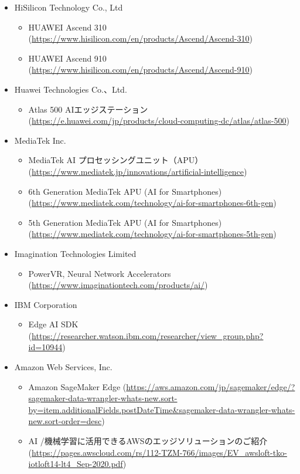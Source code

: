 \begin{itemize}
\begin{itemize}
\begin{itemize}
		\end{itemize}
		\item HiSilicon Technology Co., Ltd
		\begin{itemize}
			\item HUAWEI Ascend 310 (\url{https://www.hisilicon.com/en/products/Ascend/Ascend-310})
			\item HUAWEI Ascend 910 (\url{https://www.hisilicon.com/en/products/Ascend/Ascend-910})
		\end{itemize}
		\item Huawei Technologies Co.、Ltd.
		\begin{itemize}
			\item Atlas 500 AIエッジステーション (\url{https://e.huawei.com/jp/products/cloud-computing-dc/atlas/atlas-500})
		\end{itemize}
		\item MediaTek Inc.
		\begin{itemize}
			\item MediaTek AI プロセッシングユニット（APU） (\url{https://www.mediatek.jp/innovations/artificial-intelligence})
			\item 6th Generation MediaTek APU (AI for Smartphones) (\url{https://www.mediatek.com/technology/ai-for-smartphones-6th-gen})
			\item 5th Generation MediaTek APU (AI for Smartphones) (\url{https://www.mediatek.com/technology/ai-for-smartphones-5th-gen})
		\end{itemize}
		\item Imagination Technologies Limited
		\begin{itemize}
			\item PowerVR, Neural Network Accelerators (\url{https://www.imaginationtech.com/products/ai/})
		\end{itemize}
		\item IBM Corporation
		\begin{itemize}
			\item Edge AI SDK (\url{https://researcher.watson.ibm.com/researcher/view_group.php?id=10944})
		\end{itemize}
		\item Amazon Web Services, Inc.
		\begin{itemize}
			\item Amazon SageMaker Edge (\url{https://aws.amazon.com/jp/sagemaker/edge/?sagemaker-data-wrangler-whats-new.sort-by=item.additionalFields.postDateTime&sagemaker-data-wrangler-whats-new.sort-order=desc})
			\item AI /機械学習に活用できるAWSのエッジソリューションのご紹介 (\url{https://pages.awscloud.com/rs/112-TZM-766/images/EV_awsloft-tko-iotloft14-lt4_Sep-2020.pdf})

\end{itemize}
\end{itemize}
\end{itemize}
